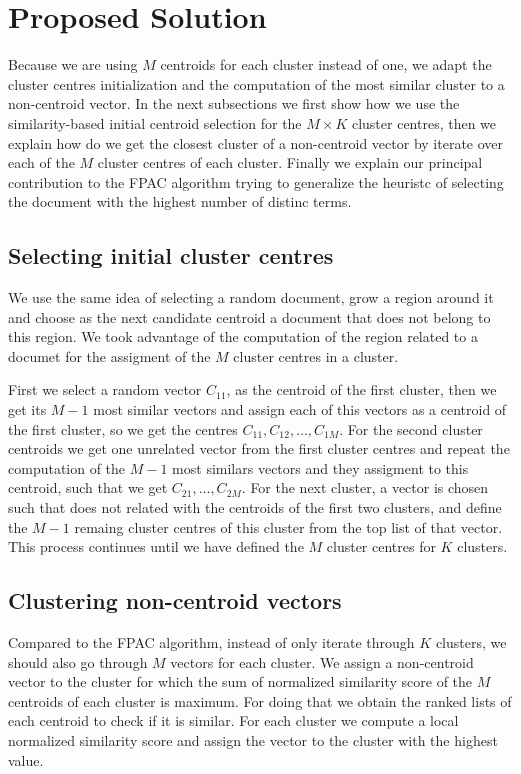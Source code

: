 \documentclass[runningheads]{llncs}
\begin{document}
\section{Proposed Solution}

Because we are using $M$ centroids for each cluster instead of one,
we adapt the cluster centres initialization and the computation
of the most similar cluster to a non-centroid vector.
In the next subsections we first show how we use the similarity-based
initial centroid selection for the $M \times K$ cluster centres,
then we explain how do we get the closest cluster of a non-centroid
vector by iterate over each of the $M$ cluster centres of each cluster.
Finally we explain our principal contribution to the FPAC algorithm
trying to generalize the heuristc of selecting the document
with the highest number of distinc terms.


\subsection{Selecting initial cluster centres}

We use the same idea of selecting a random document, grow a region around it and choose as the next candidate centroid a document that does not belong to this region. We took advantage of the computation of the region related to a documet for the assigment of the $M$ cluster centres in a cluster.

First we select a random vector $C_{11}$, as the centroid of the first cluster, then we get its $M - 1$ most similar vectors and assign each of
this vectors as a centroid of the first cluster, so we get the centres 
$C_{11}, C_{12},  \dots, C_{1M}$. For the second cluster centroids
we get one unrelated vector from the first cluster centres and 
repeat the computation of the $M-1$ most similars vectors and they 
assigment to this centroid, such that we get $C_{21}, \dots, C_{2M}$.
For the next cluster, a vector is chosen such that does not related with the centroids of the first two clusters, and define the $M-1$ remaing cluster centres of this cluster from the top list of that vector. This process continues until we have defined the $M$ cluster centres for $K$ clusters.

\subsection{Clustering non-centroid vectors}

Compared to the FPAC algorithm, instead of only iterate through
$K$ clusters, we should also go through $M$ vectors for each cluster.
We assign a non-centroid vector to the cluster for which the sum of 
normalized similarity score of the $M$ centroids of each cluster is maximum.
For doing that we obtain the ranked lists of each centroid to check if 
it is similar. For each cluster we compute a local normalized similarity score and assign the vector to the cluster with the highest value.
\end{document}
